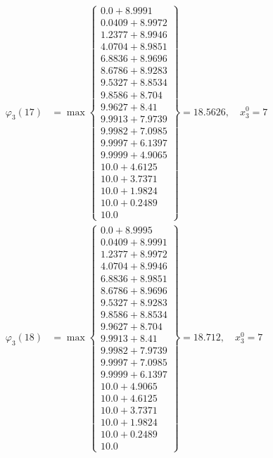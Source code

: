 \documentclass{article}
\begin{document}
\begin{align*}
  
\varphi_{3}(17) &= \max \left\{ \begin{array}{c}
0.0 + 8.9991 \\
 0.0409 + 8.9972 \\
 1.2377 + 8.9946 \\
 4.0704 + 8.9851 \\
 6.8836 + 8.9696 \\
 8.6786 + 8.9283 \\
 9.5327 + 8.8534 \\
 9.8586 + 8.704 \\
 9.9627 + 8.41 \\
 9.9913 + 7.9739 \\
 9.9982 + 7.0985 \\
 9.9997 + 6.1397 \\
 9.9999 + 4.9065 \\
 10.0 + 4.6125 \\
 10.0 + 3.7371 \\
 10.0 + 1.9824 \\
 10.0 + 0.2489 \\
 10.0
\end{array} \right\}=18.5626,\quad x_{3}^0=7\\
  
  
  
  
\varphi_{3}(18) &= \max \left\{ \begin{array}{c}
0.0 + 8.9995 \\
 0.0409 + 8.9991 \\
 1.2377 + 8.9972 \\
 4.0704 + 8.9946 \\
 6.8836 + 8.9851 \\
 8.6786 + 8.9696 \\
 9.5327 + 8.9283 \\
 9.8586 + 8.8534 \\
 9.9627 + 8.704 \\
 9.9913 + 8.41 \\
 9.9982 + 7.9739 \\
 9.9997 + 7.0985 \\
 9.9999 + 6.1397 \\
 10.0 + 4.9065 \\
 10.0 + 4.6125 \\
 10.0 + 3.7371 \\
 10.0 + 1.9824 \\
 10.0 + 0.2489 \\
 10.0
\end{array} \right\}=18.712,\quad x_{3}^0=7\\
  

\end{align*}
\end{document}
